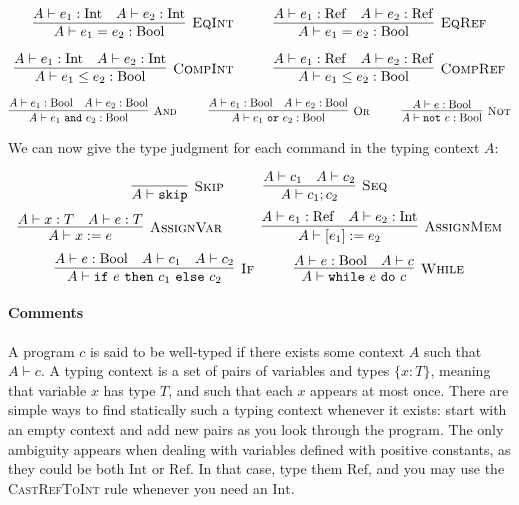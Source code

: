 \documentclass{article}
\newcommand{\Rule}[3]{\infer[\textsc{#1}]{#2}{#3}}
\newcommand{\Ref}{\mathrm{Ref}}
\newcommand{\Int}{\mathrm{Int}}
\newcommand{\Bool}{\mathrm{Bool}}
\begin{document}
\[
\Rule{EqInt}{A \vdash e_1 = e_2: \Bool}{A \vdash e_1: \Int \quad A \vdash e_2: \Int}
\hspace*{1cm}
\Rule{EqRef}{A \vdash e_1 = e_2: \Bool}{A \vdash e_1: \Ref \quad A \vdash e_2: \Ref}
\]

\[
\Rule{CompInt}{A \vdash e_1 \leq e_2: \Bool}{A \vdash e_1: \Int \quad A \vdash e_2: \Int}
\hspace*{1cm}
\Rule{CompRef}{A \vdash e_1 \leq e_2: \Bool}{A \vdash e_1: \Ref \quad A \vdash e_2: \Ref}
\]

\[
\Rule{And}{A \vdash e_1~\texttt{and}~e_2: \Bool}{A \vdash e_1: \Bool \quad A \vdash e_2: \Bool}
\hspace*{1cm}
\Rule{Or}{A \vdash e_1~\texttt{or}~e_2: \Bool}{A \vdash e_1: \Bool \quad A \vdash e_2: \Bool}
\hspace*{1cm}
\Rule{Not}{A \vdash \texttt{not}~e: \Bool}{A \vdash e: \Bool}
\]

We can now give the type judgment for each command in the typing context $A$:

\[
	\Rule{Skip}{A \vdash \texttt{skip}}{} \hspace*{1cm}
	\Rule{Seq}{A \vdash c_1 ; c_2}{A \vdash c_1 \quad A \vdash c_2}
\]
\[
	\Rule{AssignVar}{A \vdash x := e}{A \vdash x: T \quad A \vdash e: T} \hspace*{1cm}
	\Rule{AssignMem}{A \vdash [e_1] := e_2}{A \vdash e_1: \Ref \quad A \vdash e_2: \Int}
\]
\[
	\Rule{If}{A \vdash \texttt{if}~e~\texttt{then}~c_1~\texttt{else}~c_2}{A \vdash e: \Bool \quad A \vdash c_1 \quad A \vdash c_2}
\hspace*{1cm}
	\Rule{While}{A \vdash \texttt{while}~e~\texttt{do}~c}{A \vdash e: \Bool \quad A \vdash c} 
\]


\paragraph{Comments}

A program $c$ is said to be well-typed if there exists some context $A$ such that $A\vdash c$.
A typing context is a set of pairs of variables and types $\{x:T\}$, meaning that variable $x$ has type $T$, and such that each $x$ appears at most once.
There are simple ways to find statically such a typing context whenever it exists: start with an empty context and add new pairs as you look through the program. The only ambiguity appears when dealing with variables defined with positive constants, as they could be both $\Int$ or $\Ref$. In that case, type them $\Ref$, and you may use the \textsc{CastRefToInt} rule whenever you need an $\Int$.
\end{document}
